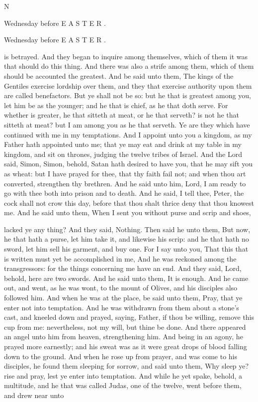 N

Wednesday before E A S T E R .

Wednesday before E A S T E R .

is betrayed. And they began to inquire among themselves, which of them it was that should do this thing. And there was also a strife among them, which of them should be accounted the greatest. And be said unto them, The kings of the Gentiles exercise lordship over them, and they that exercise authority upon them are called benefactors. But ye shall not be so: but he that is greatest among you, let him be as the younger; and he that is chief, as he that doth serve. For whether is greater, he that sitteth at meat, or he that serveth? is not he that sitteth at meat? but I am among you as he that serveth. Ye are they which have continued with me in my temptations. And I appoint unto you a kingdom, as my Father hath appointed unto me; that ye may eat and drink at my table in my kingdom, and sit on thrones, judging the twelve tribes of Israel. And the Lord said, Simon, Simon, behold, Satan hath desired to have you, that he may sift you as wheat: but I have prayed for thee, that thy faith fail not; and when thou art converted, strengthen thy brethren. And he said unto him, Lord, I am ready to go with thee both into prison and to death. And he said, I tell thee, Peter, the cock shall not crow this day, before that thou shalt thrice deny that thou knowest me. And he said unto them, When I sent you without purse and scrip and shoes,

lacked ye any thing? And they said, Nothing. Then said he unto them, But now, he that hath a purse, let him take it, and likewise his scrip: and he that hath no sword, let him sell his garment, and buy one. For I say unto you, That this that is written must yet be accomplished in me, And he was reckoned among the transgressors: for the things concerning me have an end. And they said, Lord, behold, here are two swords. And he said unto them, It is enough. And he came out, and went, as he was wont, to the mount of Olives, and his disciples also followed him. And when he was at the place, be said unto them, Pray, that ye enter not into temptation. And he was withdrawn from them about a stone's cast, and kneeled down and prayed, saying, Father, if thou be willing, remove this cup from me: nevertheless, not my will, but thine be done. And there appeared an angel unto him from heaven, strengthening him. And being in an agony, he prayed more earnestly; and his sweat was as it were great drops of blood falling down to the ground. And when he rose up from prayer, and was come to his disciples, he found them sleeping for sorrow, and said unto them, Why sleep ye? rise and pray, lest ye enter into temptation. And while he yet spake, behold, a multitude, and he that was called Judas, one of the twelve, went before them, and drew near unto

